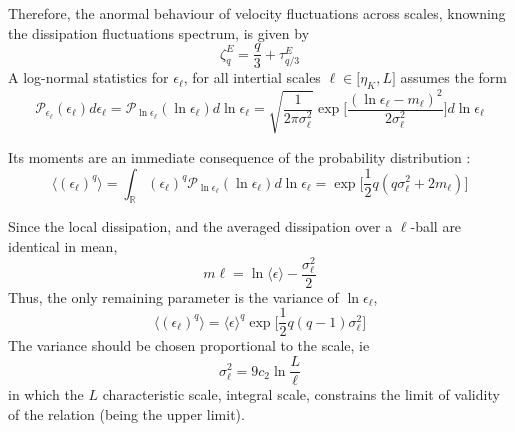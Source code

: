Therefore, the anormal behaviour of velocity fluctuations across scales, knowning the dissipation fluctuations spectrum, is given by
\begin{equation}
    \zeta_q^E=\frac{q}{3}+\tau_{q/3}^E
\end{equation}
A log-normal statistics for $\epsilon_\ell$, for all intertial scales $\ell\in\lbrack\eta_K,L\rbrack$ assumes the form
\begin{equation}
    \mathcal{P}_{\epsilon_\ell}(\epsilon_\ell)d\epsilon_\ell=\mathcal{P}_{\ln\epsilon_\ell}(\ln\epsilon_\ell)d\ln\epsilon_\ell=\sqrt{\frac{1}{2\pi\sigma_\ell^2}}\exp\bigg[\frac{(\ln\epsilon_\ell-m_\ell)^2}{2\sigma_\ell^2}\bigg]d\ln\epsilon_\ell
\end{equation}

Its moments are an immediate consequence of the probability distribution :
\begin{equation}
   \langle(\epsilon_\ell)^q\rangle =\int_\mathbb{R}(\epsilon_\ell)^q\mathcal{P}_{\ln\epsilon_\ell}(\ln\epsilon_\ell)d\ln\epsilon_\ell=\exp\bigg[\frac{1}{2}q(q\sigma_\ell^2+2m_\ell)\bigg]
\end{equation}

Since the local dissipation, and the averaged dissipation over a $\ell$-ball are identical in mean, 
\begin{equation}
    m\ell=\ln\langle\epsilon\rangle-\frac{\sigma_\ell^2}{2}
\end{equation}
Thus, the only remaining parameter is the variance of $\ln\epsilon_\ell$, 
\begin{equation}
\langle(\epsilon_\ell)^q\rangle=\langle\epsilon\rangle^q\exp\bigg[\frac{1}{2}q(q-1)\sigma_\ell^2\bigg]    
\end{equation}
The variance should be chosen proportional to the scale, ie
\begin{equation}
\sigma_\ell^2=9c_2\ln\frac{L}{\ell}    
\end{equation}
in which the $L$ characteristic scale, integral scale, constrains the limit of validity of the relation (being the upper limit). 

